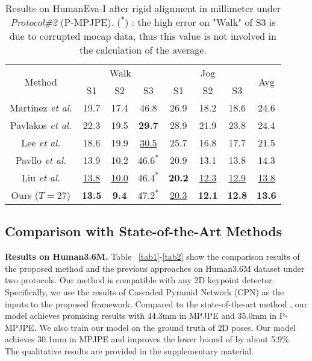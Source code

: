 \documentclass[sigconf]{acmart}
\begin{document}
\begin{table}\small
  \centering
  \caption{Results on HumanEva-I after rigid alignment in millimeter under \textit{Protocol\#2} (P-MPJPE). (\textsuperscript{$\ast$}) : the high error on "Walk" of S3 is due to corrupted mocap data, thus this value is not involved in the calculation of the average. }
\begin{tabular}{c|ccc|ccc|c}
    \toprule
   \multirow{2}{*}{Method}   & \multicolumn{3}{c|}{Walk} &\multicolumn{3}{c|}{Jog} &\multirow{2}{*}{Avg} \\

    &S1&S2&S3&S1&S2&S3\\
    \midrule
    
    Martinez \textit{et al.} \cite{martinez2017simple} & 19.7&17.4&46.8&26.9&18.2&18.6&24.6 \\
    Pavlakos \textit{et al.} \cite{pavlakos2017coarse} & 22.3&19.5&\textbf{29.7}&28.9&21.9&23.8&24.4 \\
    Lee \textit{et al.} \cite{lee2018propagating}&18.6&19.9&\underline{30.5}&25.7&16.8&17.7&21.5\\
    Pavllo \textit{et al.} \cite{jllo20193d} &13.9&10.2&46.6\textsuperscript{$\ast$}&20.9&13.1&13.8&14.3 \\
    Liu \textit{et al.} \cite{liu2020attention}&\underline{13.8}&\underline{10.0}&46.4\textsuperscript{$\ast$}&\textbf{20.2}&\underline{12.3}&\underline{12.9}&\underline{13.8}\\


    \midrule
    Ours ($T=27$) &\textbf{13.5}&\textbf{9.4}&47.2\textsuperscript{$\ast$}&\underline{20.3}&\textbf{12.1}&\textbf{12.8}&\textbf{13.6} \\
    \bottomrule
    \end{tabular}
    \vspace{-0.3cm}
  \label{tab3}
\end{table}


\subsection{Comparison with State-of-the-Art Methods}
\textbf{Results on Human3.6M.} Table ~\ref{tab1}-\ref{tab2} show the comparison results of the proposed method and the previous approaches on Human3.6M dataset under two protocols. Our method is compatible with any 2D keypoint detector. Specifically, we use the results of Cascaded Pyramid Network (CPN)  \cite{chen2018cascaded} as the inputs to the proposed framework. Compared to the state-of-the-art method \cite{zeng2020srnet}, our model achieves promising results with 44.3mm in MPJPE and 35.0mm in P-MPJPE. We also train our model on the ground truth of 2D poses. Our model achieves 30.1mm in MPJPE and improves the lower bound of \cite{zeng2020srnet} by about 5.9\%. The qualitative results are provided in the supplementary material.
\end{document}
